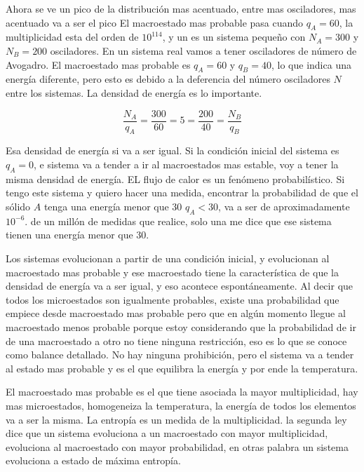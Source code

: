 \documentclass[11pt,fleqn]{book}
\begin{document}
\begin{example}

Ahora se ve un pico de la distribución mas acentuado, entre mas osciladores, mas acentuado va a ser el pico El macroestado mas probable pasa cuando $q_{A}=60$, la multiplicidad esta del orden de $10^{114}$, y un es un sistema pequeño con $N_{A}=300$ y $N_{B}=200$ osciladores. En un sistema real vamos a tener osciladores de número de Avogadro. El macroestado mas probable es $q_{A}=60$ y $q_{B}=40$, lo que indica una energía diferente, pero esto es debido a la deferencia del número osciladores $N$ entre los sistemas. La densidad de energía es lo importante.

\begin{equation*}
    \frac{N_{A}}{q_{A}}=\frac{300}{60}=5=\frac{200}{40}=\frac{N_{B}}{q_{B}}
\end{equation*}

Esa densidad de energía si va a ser igual. Si la condición inicial del sistema es $q_{A}=0$, e sistema va a tender a ir al macroestados mas estable, voy a tener la misma densidad de energía. EL flujo de calor es un fenómeno probabilístico. Si tengo este sistema y quiero hacer una medida, encontrar la probabilidad de que el sólido $A$ tenga una energía menor que 30 $q_{A}<30$, va a ser de aproximadamente $10^{-6}$. de un millón de medidas que realice, solo una me dice que ese sistema tienen una energía menor que 30.
\end{example}

Los sistemas evolucionan a partir de una condición inicial, y evolucionan al macroestado mas probable y ese macroestado tiene la característica de que la densidad de energía va a ser igual,  y eso acontece espontáneamente. Al decir que todos los microestados son igualmente probables, existe una probabilidad que empiece desde macroestado mas probable pero que en algún momento llegue al macroestado menos probable porque estoy considerando que la probabilidad de ir de una  macroestado a otro no tiene ninguna restricción, eso es lo que se conoce como balance detallado. No hay ninguna prohibición, pero el sistema va a tender al estado mas probable y es el que equilibra la energía y por ende la temperatura.

El macroestado mas probable es el que tiene asociada la mayor multiplicidad, hay mas microestados, homogeneiza la temperatura, la energía de todos los elementos va a ser la misma. La entropía es un medida de la multiplicidad. la segunda ley dice que un sistema evoluciona a un macroestado con mayor multiplicidad, evoluciona al macroestado con mayor probabilidad, en otras palabra un sistema evoluciona a estado de máxima entropía.
\end{document}
